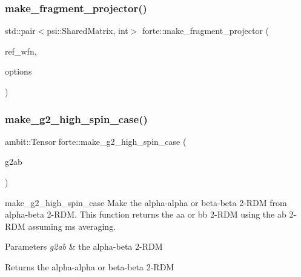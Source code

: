 \mbox{\label{namespaceforte_a7c2fa63b83ac93a7cd341f489895a68f}} 
\subsubsection{\texorpdfstring{make\+\_\+fragment\+\_\+projector()}{make\_fragment\_projector()}\hspace{0.1cm}{\footnotesize\ttfamily [2/2]}}
{\footnotesize\ttfamily std\+::pair$<$psi\+::\+Shared\+Matrix, int$>$ forte\+::make\+\_\+fragment\+\_\+projector (\begin{DoxyParamCaption}\item[{psi\+::\+Shared\+Wavefunction}]{ref\+\_\+wfn,  }\item[{std\+::shared\+\_\+ptr$<$ \mbox{\hyperlink{classforte_1_1_forte_options}{Forte\+Options}} $>$}]{options }\end{DoxyParamCaption})}

\mbox{\label{namespaceforte_a19b0aa2bb4490c7cc7127962c5b5929f}} 
\subsubsection{\texorpdfstring{make\+\_\+g2\+\_\+high\+\_\+spin\+\_\+case()}{make\_g2\_high\_spin\_case()}}
{\footnotesize\ttfamily ambit\+::\+Tensor forte\+::make\+\_\+g2\+\_\+high\+\_\+spin\+\_\+case (\begin{DoxyParamCaption}\item[{const ambit\+::\+Tensor \&}]{g2ab }\end{DoxyParamCaption})}



make\+\_\+g2\+\_\+high\+\_\+spin\+\_\+case Make the alpha-\/alpha or beta-\/beta 2-\/\+R\+DM from alpha-\/beta 2-\/\+R\+DM. This function returns the aa or bb 2-\/\+R\+DM using the ab 2-\/\+R\+DM assuming ms averaging. 


\begin{DoxyParams}{Parameters}
{\em g2ab} & the alpha-\/beta 2-\/\+R\+DM \\
\hline
\end{DoxyParams}
\begin{DoxyReturn}{Returns}
the alpha-\/alpha or beta-\/beta 2-\/\+R\+DM 
\end{DoxyReturn}
\mbox{\label{namespaceforte_a629eb691ceead9d02c24f704129e4843}} 
